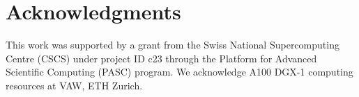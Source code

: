 \documentclass{juliacon}
\begin{document}
\section{Acknowledgments}
 This work was supported by a grant from the Swiss National Supercomputing Centre (CSCS) under project ID c23 through the Platform for Advanced Scientific Computing (PASC) program. We acknowledge A100 DGX-1 computing resources at VAW, ETH Zurich.



\end{document}
